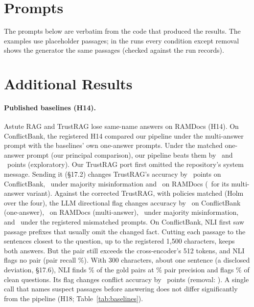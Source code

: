 \section{Prompts}
\label{app:prompts}
The prompts below are verbatim from the code that produced the results. The examples use placeholder passages; in the runs every condition except removal shows the generator the same passages (checked against the run records).


\section{Additional Results}
\label{app:extra}

\paragraph{Published baselines (H14).} Astute RAG \citep{wang2025astute} and TrustRAG \citep{zhou2025trustrag} lose same-name answers
on RAMDocs (H14). On ConflictBank, the registered H14 compared our pipeline under the multi-answer prompt with the
baselines' own one-answer prompts. Under the matched one-answer prompt (our principal comparison), our pipeline beats them by
\hFourteenMatchedAst\ and \hFourteenMatchedTr\ points (exploratory). Our TrustRAG port
first omitted the repository's system message. Sending it (\S17.2) changes TrustRAG's accuracy by \blTrustSysCb\
points on ConflictBank, \blTrustSysMj\ under majority misinformation and \blTrustSysRd\ on RAMDocs (\blTrustSysRdMulti\
for its multi-answer variant). Against the corrected TrustRAG, with policies matched (Holm over the four), the LLM
directional flag changes accuracy by \blHFourteenCbs\ on ConflictBank (one-answer), \blHFourteenRd\ on RAMDocs (multi-answer),
\blHFourteenMj\ under majority misinformation, and \blHFourteenCb\ under the registered mismatched prompts.
On ConflictBank, NLI first saw passage prefixes that usually omit the changed fact. Cutting each passage to the
sentences closest to the question, up to the registered 1,500 characters, keeps both answers. But the
pair still exceeds the cross-encoder's 512 tokens, and NLI flags no pair (pair recall \detNliWinRecall\%). With
300 characters, about one sentence (a disclosed deviation, \S17.6), NLI finds \detNliSentRecall\% of the gold pairs at
\detNliSentPrec\% pair precision and flags \detNliSentCleanFpr\% of clean questions. Its flag changes conflict
accuracy by \blNliSentFlag\ points (removal: \blNliSentRem). A single call that names suspect passages before
answering does not differ significantly from the pipeline (H18; Table~\ref{tab:baselines}).

